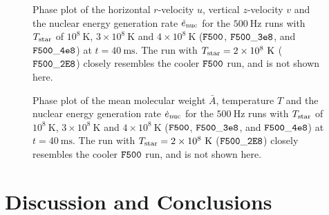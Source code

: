 \documentclass[preprint,times,tighten]{aastex63}
\begin{document}
\begin{figure}[t]
    \centering
    \caption{\label{fig:uv_hot}Phase plot of the horizontal $r$-velocity $u$, vertical $z$-velocity $v$ and the nuclear energy generation rate $\dot{e}_{\rm nuc}$ for the $500~\mathrm{Hz}$ runs with $T_{\rm star}$ of $10^8~\mathrm{K}$, $3\times10^8~\mathrm{K}$ and $4\times10^8~\mathrm{K}$ ($\tt{F500}$, $\tt{F500\_3e8}$, and $\tt{F500\_4e8}$) at $t = 40~\mathrm{ms}$. The run with $T_{\rm star} = 2\times10^8~\mathrm{K}$ ($\tt{F500\_2E8}$) closely resembles the cooler $\tt{F500}$ run, and is not shown here.}
\end{figure}

\begin{figure}[t]
    \centering
    \caption{\label{fig:abar_hot}Phase plot of the mean molecular weight $\bar{A}$, temperature $T$ and the nuclear energy generation rate $\dot{e}_{\rm nuc}$ for the $500~\mathrm{Hz}$ runs with $T_{\rm star}$ of $10^8~\mathrm{K}$, $3\times10^8~\mathrm{K}$ and $4\times10^8~\mathrm{K}$ ($\tt{F500}$, $\tt{F500\_3e8}$, and $\tt{F500\_4e8}$) at $t = 40~\mathrm{ms}$. The run with $T_{\rm star} = 2\times10^8~\mathrm{K}$ ($\tt{F500\_2E8}$) closely resembles the cooler $\tt{F500}$ run, and is not shown here.}
\end{figure}

\section{Discussion and Conclusions}\label{Sec:conclusions}
\end{document}
